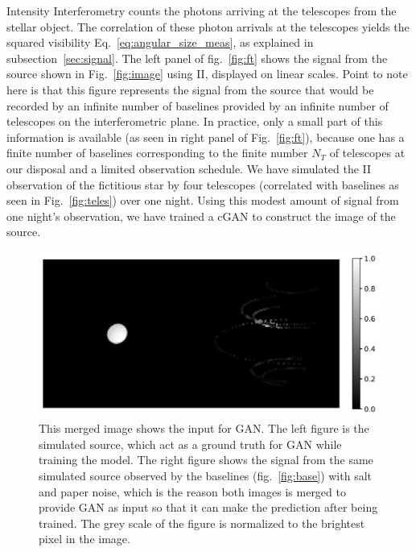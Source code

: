 Intensity Interferometry counts the photons arriving at the telescopes from the stellar object. The correlation of these photon arrivals at the telescopes yields the squared visibility Eq.~\eqref{eq:angular_size_meas}, as explained in subsection~\ref{sec:signal}. The left panel of fig.~\ref{fig:ft} shows the signal from the source shown in Fig.~\ref{fig:image} using II, displayed on linear scales. Point to note here is that this figure represents the signal from the source that would be recorded by an infinite number of baselines provided by an infinite number of telescopes on the interferometric plane. In practice, only a small part of this information is available (as seen in right panel of Fig.~\ref{fig:ft}), because one has a finite number of baselines corresponding to the finite number $N_T$ of telescopes at our disposal and a limited observation schedule. We have simulated the II observation of the fictitious star by four telescopes (correlated with baselines as seen in Fig.~\ref{fig:teles}) over one night. Using this modest amount of signal from one night's observation, we have trained a cGAN to construct the image of the source.
\begin{figure}
   \centering
  \includegraphics[width=0.85\linewidth]{fig/ellipse1612.jpg}
  \caption{This merged image shows the input for GAN. The left figure is the simulated source, which act as a ground truth for GAN while training the model. The right figure shows the signal from the same simulated source observed by the baselines (fig.~\ref{fig:base}) with salt and paper noise, which is the reason both images is merged to provide GAN as input so that it can make the prediction after being trained. The grey scale of the figure is normalized to the brightest pixel in the image.}
  \label{fig:GANinput}
\end{figure}
